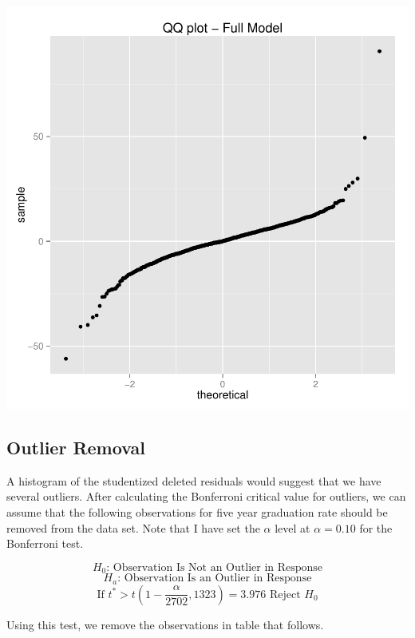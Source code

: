 \documentclass{article}
\begin{document}
\includegraphics{Fig-qqplot}

\FloatBarrier

\subsection{Outlier Removal}

A histogram of the studentized deleted residuals would suggest that we have several outliers. After calculating the Bonferroni critical value for outliers, we can assume that the following observations for five year graduation rate should be removed from the data set. Note that I have set the $\alpha$ level at $\alpha = 0.10$ for the Bonferroni test.

$$ H_0 \text{: Observation Is Not an Outlier in Response} $$
$$ H_a \text{: Observation Is an Outlier in Response} $$
$$ \text{If }t^* > t(1-\frac{\alpha}{2702},1323) = 3.976 \text{ Reject }H_0 $$

Using this test, we remove the observations in table that follows.
\end{document}
